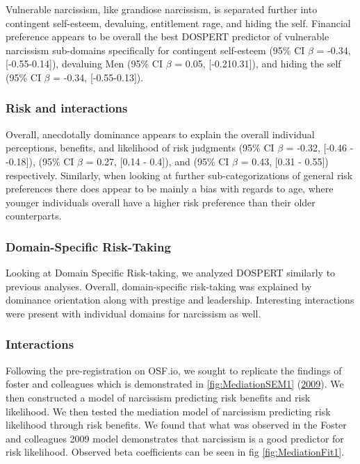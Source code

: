 \documentclass[
  donotrepeattitle,doc, 12pt, a4paper,floatsintext]{apa7}
\begin{document}
Vulnerable narcissism, like grandiose narcissism, is separated further into contingent self-esteem, devaluing, entitlement rage, and hiding the self. Financial preference appears to be overall the best DOSPERT predictor of vulnerable narcissism sub-domains specifically for contingent self-esteem (95\% CI \(\beta\) = -0.34, {[}-0.55-0.14{]}), devaluing Men (95\% CI \(\beta\) = 0.05, {[}-0.210.31{]}), and hiding the self (95\% CI \(\beta\) = -0.34, {[}-0.55-0.13{]}).

\hypertarget{risk-and-interactions}{%
\subsubsection{Risk and interactions}\label{risk-and-interactions}}

Overall, anecdotally dominance appears to explain the overall individual perceptions, benefits, and likelihood of risk judgments (95\% CI \(\beta\) = -0.32, {[}-0.46 - -0.18{]}), (95\% CI \(\beta\) = 0.27, {[}0.14 - 0.4{]}), and (95\% CI \(\beta\) = 0.43, {[}0.31 - 0.55{]}) respectively. Similarly, when looking at further sub-categorizations of general risk preferences there does appear to be mainly a bias with regards to age, where younger individuals overall have a higher risk preference than their older counterparts.

\hypertarget{domain-specific-risk-taking-1}{%
\subsubsection{Domain-Specific Risk-Taking}\label{domain-specific-risk-taking-1}}

Looking at Domain Specific Risk-taking, we analyzed DOSPERT similarly to previous analyses. Overall, domain-specific risk-taking was explained by dominance orientation along with prestige and leadership. Interesting interactions were present with individual domains for narcissism as well.

\hypertarget{interactions-1}{%
\subsubsection{Interactions}\label{interactions-1}}

Following the pre-registration on OSF.io, we sought to replicate the findings of foster and colleagues which is demonstrated in \ref{fig:MediationSEM1} (\protect\hyperlink{ref-foster2009}{2009}). We then constructed a model of narcissism predicting risk benefits and risk likelihood. We then tested the mediation model of narcissism predicting risk likelihood through risk benefits. We found that what was observed in the Foster and colleagues 2009 model demonstrates that narcissism is a good predictor for risk likelihood. Observed beta coefficients can be seen in fig \ref{fig:MediationFit1}.
\end{document}
